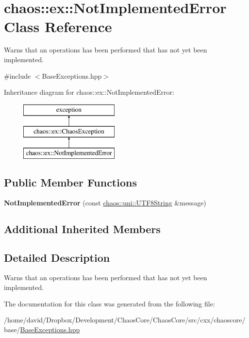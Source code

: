 \hypertarget{classchaos_1_1ex_1_1_not_implemented_error}{\section{chaos\-:\-:ex\-:\-:Not\-Implemented\-Error Class Reference}
\label{classchaos_1_1ex_1_1_not_implemented_error}
}


Warns that an operations has been performed that has not yet been implemented.  




{\ttfamily \#include $<$Base\-Exceptions.\-hpp$>$}

Inheritance diagram for chaos\-:\-:ex\-:\-:Not\-Implemented\-Error\-:\begin{figure}[H]
\begin{center}
\leavevmode
\includegraphics[height=3.000000cm]{classchaos_1_1ex_1_1_not_implemented_error}
\end{center}
\end{figure}
\subsection*{Public Member Functions}
\begin{DoxyCompactItemize}
\item 
\hypertarget{classchaos_1_1ex_1_1_not_implemented_error_a2e51452c959e229dfc4f46fad6c4c15f}{{\bfseries Not\-Implemented\-Error} (const \hyperlink{classchaos_1_1uni_1_1_u_t_f8_string}{chaos\-::uni\-::\-U\-T\-F8\-String} \&message)}\label{classchaos_1_1ex_1_1_not_implemented_error_a2e51452c959e229dfc4f46fad6c4c15f}

\end{DoxyCompactItemize}
\subsection*{Additional Inherited Members}


\subsection{Detailed Description}
Warns that an operations has been performed that has not yet been implemented. 

The documentation for this class was generated from the following file\-:\begin{DoxyCompactItemize}
\item 
/home/david/\-Dropbox/\-Development/\-Chaos\-Core/\-Chaos\-Core/src/cxx/chaoscore/base/\hyperlink{_base_exceptions_8hpp}{Base\-Exceptions.\-hpp}\end{DoxyCompactItemize}
